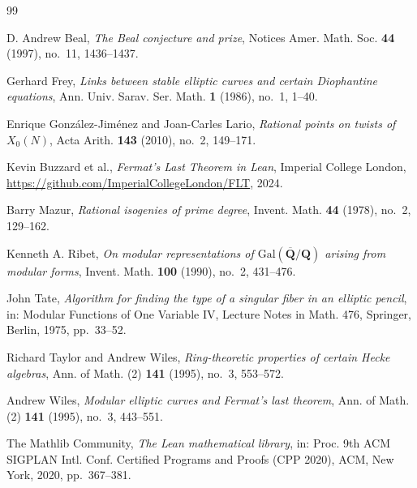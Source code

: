 \documentclass{amsart}
\begin{document}
\begin{thebibliography}{99}

 D. Andrew Beal, \emph{The Beal conjecture and prize},
Notices Amer. Math. Soc. \textbf{44} (1997), no.~11, 1436--1437.

 Gerhard Frey, \emph{Links between stable elliptic
curves and certain Diophantine equations}, Ann. Univ. Sarav. Ser. Math.
\textbf{1} (1986), no.~1, 1--40.

 Enrique Gonz\'{a}lez-Jim\'{e}nez and Joan-Carles Lario,
\emph{Rational points on twists of $X_0(N)$}, Acta Arith. \textbf{143}
(2010), no.~2, 149--171.

 Kevin Buzzard et al., \emph{Fermat's Last Theorem in
Lean}, Imperial College London,
\url{https://github.com/ImperialCollegeLondon/FLT}, 2024.

 Barry Mazur, \emph{Rational isogenies of prime
degree}, Invent. Math. \textbf{44} (1978), no.~2, 129--162.

 Kenneth A. Ribet, \emph{On modular representations of
$\mathrm{Gal}(\overline{\mathbf{Q}}/\mathbf{Q})$ arising from modular
forms}, Invent. Math. \textbf{100} (1990), no.~2, 431--476.

 John Tate, \emph{Algorithm for finding the type of a
singular fiber in an elliptic pencil}, in: Modular Functions of One
Variable IV, Lecture Notes in Math. 476, Springer, Berlin, 1975, pp.~33--52.

 Richard Taylor and Andrew Wiles,
\emph{Ring-theoretic properties of certain Hecke algebras}, Ann. of Math.
(2) \textbf{141} (1995), no.~3, 553--572.

 Andrew Wiles, \emph{Modular elliptic curves and
Fermat's last theorem}, Ann. of Math. (2) \textbf{141} (1995), no.~3,
443--551.

 The Mathlib Community, \emph{The Lean mathematical
library}, in: Proc. 9th ACM SIGPLAN Intl. Conf. Certified Programs and
Proofs (CPP 2020), ACM, New York, 2020, pp.~367--381.

\end{thebibliography}
\end{document}
